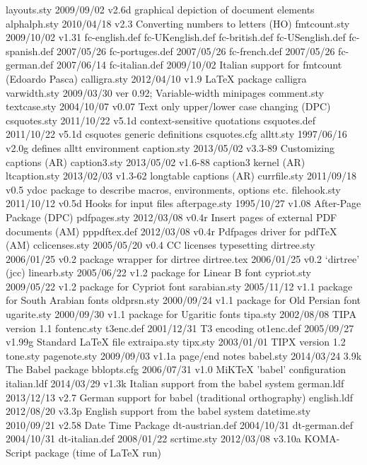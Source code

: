  layouts.sty    2009/09/02 v2.6d graphical depiction of document elements
alphalph.sty    2010/04/18 v2.3 Converting numbers to letters (HO)
fmtcount.sty    2009/10/02 v1.31
fc-english.def
fc-UKenglish.def
fc-british.def
fc-USenglish.def
fc-spanish.def    2007/05/26
fc-portuges.def    2007/05/26
fc-french.def    2007/05/26
fc-german.def    2007/06/14
fc-italian.def    2009/10/02 Italian support for fmtcount (Edoardo Pasca)
calligra.sty    2012/04/10 v1.9 LaTeX package calligra
varwidth.sty    2009/03/30 ver 0.92;  Variable-width minipages
 comment.sty    
textcase.sty    2004/10/07 v0.07 Text only upper/lower case changing (DPC)
csquotes.sty    2011/10/22 v5.1d context-sensitive quotations
csquotes.def    2011/10/22 v5.1d csquotes generic definitions
csquotes.cfg    
   alltt.sty    1997/06/16 v2.0g defines alltt environment
 caption.sty    2013/05/02 v3.3-89 Customizing captions (AR)
caption3.sty    2013/05/02 v1.6-88 caption3 kernel (AR)
ltcaption.sty    2013/02/03 v1.3-62 longtable captions (AR)
currfile.sty    2011/09/18 v0.5 ydoc package to describe macros, environments, options etc.
filehook.sty    2011/10/12 v0.5d Hooks for input files
afterpage.sty    1995/10/27 v1.08 After-Page Package (DPC)
pdfpages.sty    2012/03/08 v0.4r Insert pages of external PDF documents (AM)
pppdftex.def    2012/03/08 v0.4r Pdfpages driver for pdfTeX (AM)
cclicenses.sty    2005/05/20 v0.4 CC licenses typesetting
 dirtree.sty    2006/01/25 v0.2 package wrapper for dirtree
 dirtree.tex    2006/01/25 v0.2 `dirtree' (jcc)
 linearb.sty    2005/06/22 v1.2 package for Linear B font
 cypriot.sty    2009/05/22 v1.2 package for Cypriot font
sarabian.sty    2005/11/12 v1.1 package for South Arabian fonts
 oldprsn.sty    2000/09/24 v1.1 package for Old Persian font
 ugarite.sty    2000/09/30 v1.1 package for Ugaritic fonts
    tipa.sty    2002/08/08 TIPA version 1.1
 fontenc.sty
   t3enc.def    2001/12/31 T3 encoding
  ot1enc.def    2005/09/27 v1.99g Standard LaTeX file
extraipa.sty
    tipx.sty    2003/01/01 TIPX version 1.2
    tone.sty
pagenote.sty    2009/09/03 v1.1a page/end notes
   babel.sty    2014/03/24 3.9k The Babel package
 bblopts.cfg    2006/07/31 v1.0 MiKTeX 'babel' configuration
 italian.ldf    2014/03/29 v1.3k Italian support from the babel system
  german.ldf    2013/12/13 v2.7 German support for babel (traditional orthography)
 english.ldf    2012/08/20 v3.3p English support from the babel system
datetime.sty    2010/09/21 v2.58 Date Time Package
dt-austrian.def    2004/10/31
dt-german.def    2004/10/31
dt-italian.def    2008/01/22
 scrtime.sty    2012/03/08 v3.10a KOMA-Script package (time of LaTeX run)
